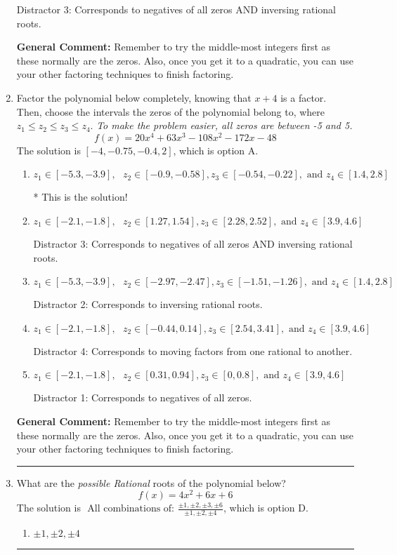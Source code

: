 \documentclass{extbook}[14pt]
\newcommand{\litem}[1]{\item #1

\rule{\textwidth}{0.4pt}}
\begin{document}
\begin{enumerate}
{\begin{enumerate}[label=\Alph*.]
 Distractor 3: Corresponds to negatives of all zeros AND inversing rational roots.
\end{enumerate}

\textbf{General Comment:} Remember to try the middle-most integers first as these normally are the zeros. Also, once you get it to a quadratic, you can use your other factoring techniques to finish factoring.
}
\litem{
Factor the polynomial below completely, knowing that $x+4$ is a factor. Then, choose the intervals the zeros of the polynomial belong to, where $z_1 \leq z_2 \leq z_3 \leq z_4$. \textit{To make the problem easier, all zeros are between -5 and 5.}
\[ f(x) = 20x^{4} +63 x^{3} -108 x^{2} -172 x -48 \]The solution is \( [-4, -0.75, -0.4, 2] \), which is option A.\begin{enumerate}[label=\Alph*.]
\item \( z_1 \in [-5.3, -3.9], \text{   }  z_2 \in [-0.9, -0.58], z_3 \in [-0.54, -0.22], \text{   and   } z_4 \in [1.4, 2.8] \)

* This is the solution!
\item \( z_1 \in [-2.1, -1.8], \text{   }  z_2 \in [1.27, 1.54], z_3 \in [2.28, 2.52], \text{   and   } z_4 \in [3.9, 4.6] \)

 Distractor 3: Corresponds to negatives of all zeros AND inversing rational roots.
\item \( z_1 \in [-5.3, -3.9], \text{   }  z_2 \in [-2.97, -2.47], z_3 \in [-1.51, -1.26], \text{   and   } z_4 \in [1.4, 2.8] \)

 Distractor 2: Corresponds to inversing rational roots.
\item \( z_1 \in [-2.1, -1.8], \text{   }  z_2 \in [-0.44, 0.14], z_3 \in [2.54, 3.41], \text{   and   } z_4 \in [3.9, 4.6] \)

 Distractor 4: Corresponds to moving factors from one rational to another.
\item \( z_1 \in [-2.1, -1.8], \text{   }  z_2 \in [0.31, 0.94], z_3 \in [0, 0.8], \text{   and   } z_4 \in [3.9, 4.6] \)

 Distractor 1: Corresponds to negatives of all zeros.
\end{enumerate}

\textbf{General Comment:} Remember to try the middle-most integers first as these normally are the zeros. Also, once you get it to a quadratic, you can use your other factoring techniques to finish factoring.
}
\litem{
What are the \textit{possible Rational} roots of the polynomial below?
\[ f(x) = 4x^{2} +6 x + 6 \]The solution is \( \text{ All combinations of: }\frac{\pm 1,\pm 2,\pm 3,\pm 6}{\pm 1,\pm 2,\pm 4} \), which is option D.\begin{enumerate}[label=\Alph*.]
\item \( \pm 1,\pm 2,\pm 4 \)


\end{enumerate}}
\end{enumerate}
\end{document}
